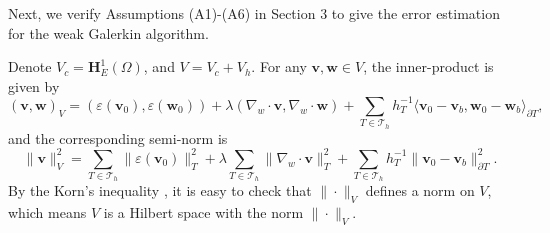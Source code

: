 \documentclass[leqno,CJK]{siamltex704}
\numberwithin{equation}{section}
\def\sumT{\sum_{T\in\mathcal{T}_h}}     %
\def\bw{{\mathbf{w}}}
\def\bv{{\mathbf{v}}}
\def\bh{{\mathbf{H}}}
\newcommand{\eps}{\varepsilon}
\newcommand{\la}{\langle}
\newcommand{\ra}{\rangle_{\partial T}}
\begin{document}
Next, we verify Assumptions (A1)-(A6) in Section 3 to give the
error estimation for the weak Galerkin algorithm.

Denote $V_c=\bh_E^1(\Omega)$,
and $V =V_c+V_h$. For any $\bv,\bw\in V$, the inner-product is given by
\begin{equation*}
	(\bv,\bw)_V = (\eps(\bv_0),\eps(\bw_0)) +\lambda(\nabla_w\cdot\bv,\nabla_w\cdot\bw)+\sumT h_T^{-1}\la \bv_0-\bv_b,\bw_0-\bw_b\ra,
\end{equation*}
and the corresponding semi-norm is
\begin{equation*}
	\|\bv\|_V^2 = \sumT\|\eps(\bv_0)\|_T^2 + \lambda\sumT\|\nabla_w\cdot\bv\|_T^2 +\sumT h_T^{-1}\|\bv_0-\bv_b\|_{\partial T}^2.
\end{equation*}
By the Korn's inequality \cite{Wang2015a}, it is easy to check that $\|\cdot\|_V$ defines a norm on $V$, which means $V$ is a Hilbert space with the norm $\|\cdot\|_V$.
\end{document}
